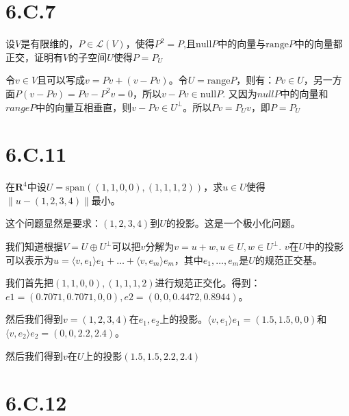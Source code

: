 \documentclass[10pt,a4paper,UTF8]{article}
\begin{document}
\section{6.C.7}
\label{sec:org161e879}


\begin{tikzproblem}
设\(V\)是有限维的，\(P\in \mathcal{L}(V)\)，使得\(P^{2} = P\),且\(\mathrm{null} P\)中的向量与\(\mathrm{range}P\)中的向量都正交，证明有\(V\)的子空间\(U\)使得\(P = P_{U}\)
\end{tikzproblem}

\begin{tikzanswer}
令\(v\in V\)且可以写成\(v= Pv + (v-Pv)\)。令\(U =  \mathrm{range}P\)，则有：\(Pv \in U\)，另一方面\(P(v-Pv) = Pv - P^{2}v = 0\)，所以\(v-P{v}\in \mathrm{null}P\). 又因为\(nullP\)中的向量和\(range P\)中的向量互相垂直，则\(v-Pv \in U^{\bot}\)。所以\(Pv = P_{U}v\)，即\(P=P_{U}\)
\end{tikzanswer}
\section{6.C.11}
\label{sec:org0271db9}


\begin{tikzproblem}
在\(\mathbf{R}^{4}\)中设\(U= \mathrm{span}((1,1,0,0),(1,1,1,2))\)，求\(u\in U\)使得\(\| u - (1,2,3,4) \|\)最小。
\end{tikzproblem}
\begin{tikzanswer}
这个问题显然是要求：\((1,2,3,4)\)到\(U\)的投影。这是一个极小化问题。

我们知道根据\(V = U\oplus U^{\bot}\)可以把\(v\)分解为\(v = u + w,u\in U,w\in U^{\bot}\). \(v\)在\(U\)中的投影可以表示为\(u = \langle v,e_{1} \rangle e_{1} + \ldots + \langle v,e_{m} \rangle e_{m}\)，其中\(e_{1},\ldots ,e_{m}\)是\(U\)的规范正交基。

我们首先把\((1,1,0,0),(1,1,1,2)\)进行规范正交化。得到：\(e1 = (0.7071, 0.7071, 0,0),e2 = (0,0,0.4472,0.8944)\)。

然后我们得到\(v =(1,2,3,4)\)在\(e_{1},e_{2}\)上的投影。\(\langle v,e_{1} \rangle e_{1} = (1.5,1.5,0,0)\)和\(\langle v,e_{2} \rangle e_{2} = (0,0,2.2,2.4)\)。

然后我们得到\(v\)在\(U\)上的投影\((1.5,1.5,2.2,2.4)\)
\end{tikzanswer}
\section{6.C.12}
\label{sec:orgf5fcf3b}
\end{document}

